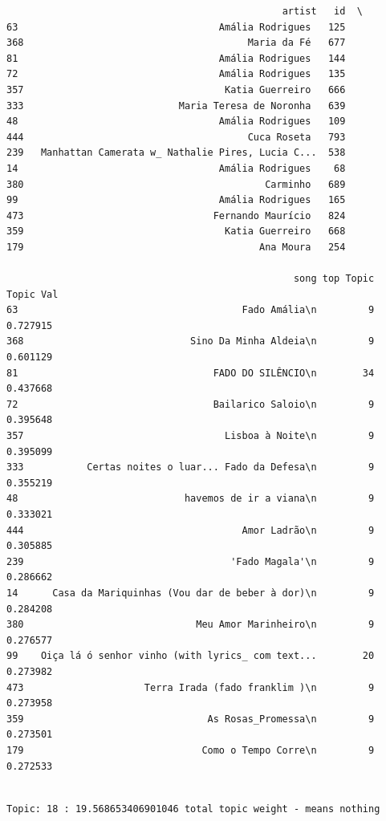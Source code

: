 \documentclass[11pt]{article}
\begin{document}
    
    \begin{verbatim}
                                                artist   id  \
63                                   Amália Rodrigues   125   
368                                       Maria da Fé   677   
81                                   Amália Rodrigues   144   
72                                   Amália Rodrigues   135   
357                                   Katia Guerreiro   666   
333                           Maria Teresa de Noronha   639   
48                                   Amália Rodrigues   109   
444                                       Cuca Roseta   793   
239   Manhattan Camerata w_ Nathalie Pires, Lucia C...  538   
14                                   Amália Rodrigues    68   
380                                          Carminho   689   
99                                   Amália Rodrigues   165   
473                                 Fernando Maurício   824   
359                                   Katia Guerreiro   668   
179                                         Ana Moura   254   

                                                  song top Topic  Topic Val  
63                                       Fado Amália\n         9   0.727915  
368                             Sino Da Minha Aldeia\n         9   0.601129  
81                                  FADO DO SILÊNCIO\n        34   0.437668  
72                                  Bailarico Saloio\n         9   0.395648  
357                                   Lisboa à Noite\n         9   0.395099  
333           Certas noites o luar... Fado da Defesa\n         9   0.355219  
48                             havemos de ir a viana\n         9   0.333021  
444                                      Amor Ladrão\n         9   0.305885  
239                                    'Fado Magala'\n         9   0.286662  
14      Casa da Mariquinhas (Vou dar de beber à dor)\n         9   0.284208  
380                              Meu Amor Marinheiro\n         9   0.276577  
99    Oiça lá ó senhor vinho (with lyrics_ com text...        20   0.273982  
473                     Terra Irada (fado franklim )\n         9   0.273958  
359                                As Rosas_Promessa\n         9   0.273501  
179                               Como o Tempo Corre\n         9   0.272533  
    \end{verbatim}

    
    \begin{Verbatim}[commandchars=\\\{\}]

Topic: 18 : 19.568653406901046 total topic weight - means nothing

    \end{Verbatim}
\end{document}
